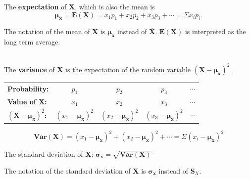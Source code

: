 \documentclass[a4paper, 12pt,twoside]{book}
\begin{document}
The \textbf{expectation} of \textbf{X}, which is also the mean is
$$\mathbf{\mu_x} = \textbf{E}(\textbf{X}) = x_1p_1 + x_2p_2 + x_3p_3 + \cdots = \Sigma x_ip_i.$$


\colorbox{babypink}{\parbox{\textwidth}{
The notation of the mean of \textbf{X} is $\mathbf{\mu_x}$ instead of $\overline{\textbf{X}}$. $\textbf{E}(\textbf{X})$ is interpreted as the long term average.
}}
\vspace{0.6cm}\\

 The \textbf{variance} of  \textbf{X} is the expectation of the random variable $(\textbf{X}-\mathbf{\mu_x})^2$. 

         \begin{table}[H]
          \centering
         \begin{tabular}{lcccc}
         \hline       
                  \textbf{Probability:} &\hspace{0.2cm}$p_1$&\hspace{0.2cm}$p_2$
         &\hspace{0.2cm}$p_3$&$\cdots$\\
         \vspace{3pt}

         \textbf{Value of X:} &\hspace{0.2cm}$x_1$&\hspace{0.2cm}$x_2$
         &\hspace{0.2cm}$x_3$&$\cdots$\\
         \vspace{3pt}
         $(\textbf{X}-\mathbf{\mu_x})^2$\textbf{:}&\hspace{0.2cm}$(x_1-\mathbf{\mu_x})^2$&\hspace{0.2cm}$(x_2-\mathbf{\mu_x})^2$&\hspace{0.2cm}
         $(x_3-\mathbf{\mu_x})^2$&$\cdots$\\
         \hline
         \end{tabular}
     \end{table}
     
     $$\textbf{Var}(\textbf{X}) = (x_1-\mathbf{\mu_x})^2 + (x_2-\mathbf{\mu_x})^2 + \cdots = \Sigma (x_i-\mathbf{\mu_x})^2$$
     \vspace{0.3cm}
     
     The standard deviation of \textbf{X}: \vspace{0.3cm}$\mathbf{\sigma_x} = \sqrt{\textbf{Var}(\textbf{X})}$
     
     \colorbox{babypink}{\parbox{\textwidth}{
The notation of the standard deviation of \textbf{X} is $\mathbf{\sigma_x}$ instead of $\textbf{S}_X$.
}}
\vspace{0.6cm}\\
\end{document}
